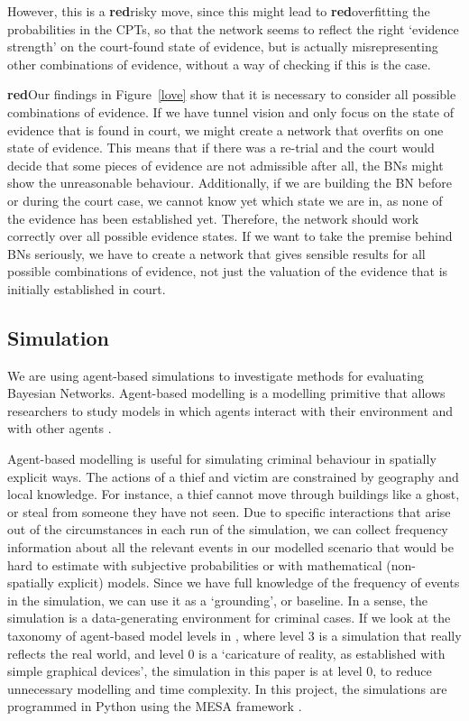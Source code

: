 \documentclass[12pt]{article}
\begin{document}
\begin{enumerate}
However, this is a \textbf{red}{risky} move, since this might lead to \textbf{red}{overfitting} the probabilities in the CPTs, so that the network seems to reflect the right `evidence strength' on the court-found state of evidence, but is actually misrepresenting other combinations of evidence, without a way of checking if this is the case.




\end{enumerate}


\textbf{red}{Our findings in Figure~\ref{love} show that it is necessary to consider all possible combinations of evidence.} If we have tunnel vision and only focus on the state of evidence that is found in court, we might create a network that overfits on one state of evidence. This means that if there was a re-trial and the court would decide that some pieces of evidence are not admissible after all, the BNs might show the unreasonable behaviour. Additionally, if we are building the BN before or during the court case, we cannot know yet which state we are in, as none of the evidence has been established yet. Therefore, the network should work correctly over all possible evidence states. If we want to take the premise behind BNs seriously, we have to create a network that gives sensible results for all possible combinations of evidence, not just the valuation of the evidence that is initially established in court.

\subsection{Simulation}

We are using agent-based simulations to investigate methods for evaluating Bayesian Networks. Agent-based modelling is a modelling primitive that allows researchers to study models in which agents interact with their environment and with other agents \citep{gilbert2000}. 

Agent-based modelling is useful for simulating criminal behaviour in spatially explicit ways. The actions of a thief and victim are constrained by geography and local knowledge. For instance, a thief cannot move through buildings like a ghost, or steal from someone they have not seen. Due to specific interactions that arise out of the circumstances in each run of the simulation, we can collect frequency information about all the relevant events in our modelled scenario that would be hard to estimate with subjective probabilities or with mathematical (non-spatially explicit) models. Since we have full knowledge of the frequency of events in the simulation, we can use it as a `grounding', or baseline. In a sense, the simulation is a data-generating environment for criminal cases. If we look at the taxonomy of agent-based model levels in \citep{gilbert2005}, where level 3 is a simulation that really reflects the real world, and level 0 is a `caricature of reality, as established with simple graphical devices', the simulation in this paper is at level 0, to reduce unnecessary modelling and time complexity. In this project, the simulations are programmed in Python using the MESA framework  \citep{mesa2020}.
\end{document}
